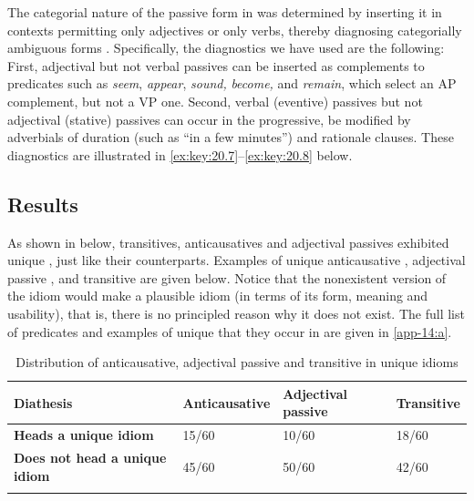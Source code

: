 \documentclass[output=paper]{langsci/langscibook}
\begin{document}
The categorial nature of the passive form in  was determined by inserting
it in contexts permitting only adjectives or only verbs, thereby diagnosing
categorially ambiguous forms \parencite[see][]{Wasow1977}.  Specifically, the
diagnostics we have used are the following: First, adjectival but not verbal
passives can be inserted as complements to predicates such as \emph{seem},
\emph{appear}, \emph{sound,} \emph{become,} and \emph{remain}, which select an
AP complement, but not a VP one. Second, verbal (eventive) passives but not
adjectival (stative) passives can occur in the progressive, be modified by
adverbials of duration (such as ``in a few minutes'') and rationale clauses.
These diagnostics are illustrated in \eqref{ex:key:20.7}--\eqref{ex:key:20.8} below.

\ea\label{ex:key:20.7}
    \z
\z

\ea\label{ex:key:20.8}
    \z
\z

\subsection{Results}  %

As shown in  below, transitives, anticausatives and
adjectival passives exhibited unique , just like their 
counterparts. Examples of unique anticausative , adjectival
passive , and transitive   are given below.
Notice that the nonexistent version of the idiom would make a plausible idiom
(in terms of its form, meaning and usability), that is, there is no principled
reason why it does not exist. The full list of predicates and examples of
unique  that they occur in are given in \ref{app-14:a}.

\begin{table}
\caption{Distribution of anticausative, adjectival passive
and transitive in unique idioms}\label{tab:key:20.1}
\begin{tabularx}{\textwidth}{lXXX}
\lsptoprule
{\bfseries Diathesis} & {\bfseries Anticausative} & {\bfseries Adjectival passive} & {\bfseries Transitive}\\
\midrule
{\bfseries Heads a unique idiom} & 15/60 & 10/60 & 18/60\\
{\bfseries Does not head a unique idiom} & 45/60 & 50/60 & 42/60\\
\lspbottomrule
\end{tabularx}
\end{table}
\end{document}
